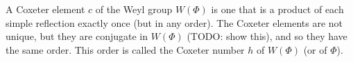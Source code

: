 A Coxeter element $c$ of the Weyl group $W(\Phi)$ is one that is a product
of each simple reflection exactly once (but in any order). The Coxeter
elements are not unique, but they are conjugate in $W(\Phi)$ (TODO: show this),
and so they have the same order. This order is called the Coxeter number $h$
of $W(\Phi)$ (or of $\Phi$).
